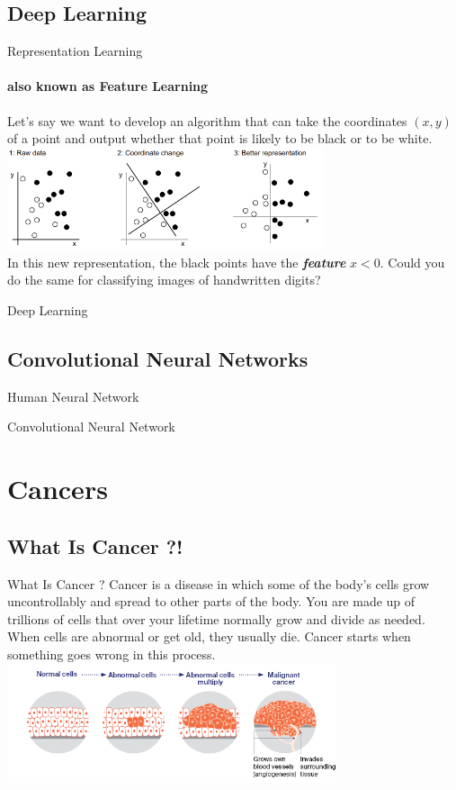 \documentclass{beamer}
\begin{document}
    \subsection{Deep Learning}
    \begin{frame}{Representation Learning}
      \framesubtitle{also known as Feature Learning}%
      \justifying
      Let’s say we want to develop an algorithm that can take the  
      coordinates  $(x, y)$  of  a  point  and  output  whether  
      that point is likely to be black or to be white. \\
      \vfill
      \centering
      \includegraphics[height=30mm]{resources/rpl.png} \\
      In this new representation, the black points have
      the \textbf{\textit{feature}} $x < 0$.
      Could you do the same for classifying images of handwritten digits?
    \end{frame}
    \begin{frame}[t]{Deep Learning}
    \end{frame}
    
    \subsection{Convolutional Neural Networks}
    \begin{frame}{Human Neural Network}
    \end{frame}
    
    \begin{frame}{Convolutional Neural Network}
    \end{frame}

    \section{Cancers}
    \subsection{What Is Cancer ?!}
    \begin{frame}{What Is Cancer ?} 
      \centering
      Cancer is a disease in which some of the body’s cells grow uncontrollably and spread to other parts of the body. 
      You are made up of trillions of cells that over your lifetime normally grow and divide as needed. When cells are abnormal or get old, they usually die. Cancer starts when something goes wrong in this process.
      \vfill
      \includegraphics[height=3.5cm]{resources/How_cancer_starts}
    \end{frame}
\end{document}

